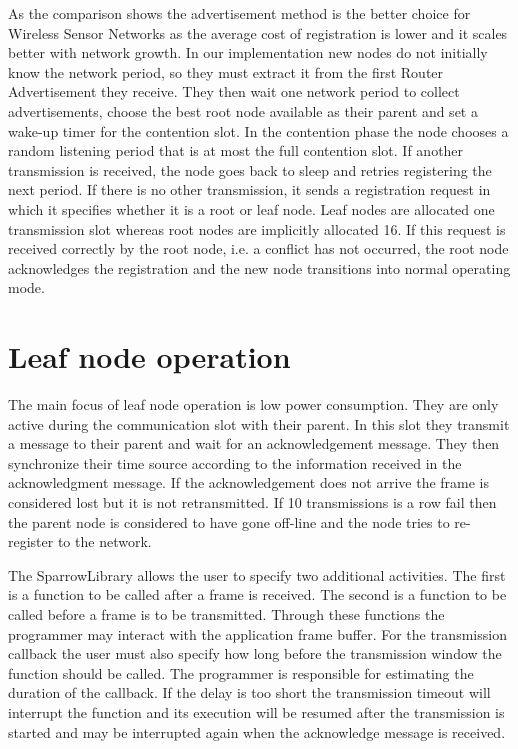 As the comparison shows the advertisement method is the better choice for
Wireless Sensor Networks as the average cost of registration is lower and it
scales better with network growth. In our implementation new nodes do not
initially know the network period, so they must extract it from the first
Router Advertisement they receive. They then wait one network period to collect
advertisements, choose the best root node available as their parent and set a
wake-up timer for the contention slot. In the contention phase the node chooses
a random listening period that is at most the full contention slot. If another
transmission is received, the node goes back to sleep and retries registering
the next period. If there is no other transmission, it sends a registration
request in which it specifies whether it is a root or leaf node.  Leaf nodes
are allocated one transmission slot whereas root nodes are implicitly allocated
16. If this request is received correctly by the root node, i.e. a conflict has
not occurred, the root node acknowledges the registration and the new node
transitions into normal operating mode.

\section{Leaf node operation}
\label{sec:leaf_node_operation}

The main focus of leaf node operation is low power consumption. They are only
active during the communication slot with their parent. In this slot they
transmit a message to their parent and wait for an acknowledgement message.
They then synchronize their time source according to the information received
in the acknowledgment message. If the acknowledgement does not arrive the frame
is considered lost but it is not retransmitted. If 10 transmissions is a row
fail then the parent node is considered to have gone off-line and the node
tries to re-register to the network. 

The SparrowLibrary allows the user to specify two additional activities. The
first is a function to be called after a frame is received. The second is a
function to be called before a frame is to be transmitted. Through these
functions the programmer may interact with the application frame buffer. For
the transmission callback the user must also specify how long before the
transmission window the function should be called.  The programmer is
responsible for estimating the duration of the callback. If the delay is too
short the transmission timeout will interrupt the function and its execution
will be resumed after the transmission is started and may be interrupted again
when the acknowledge message is received.

